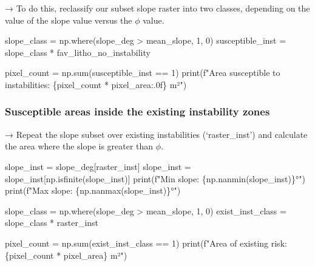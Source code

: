 \documentclass[
  letterpaper,
  DIV=11,
  numbers=noendperiod]{scrartcl}
\newenvironment{Shaded}{\begin{snugshade}}{\end{snugshade}}
\newcommand{\BuiltInTok}[1]{\textcolor[rgb]{0.00,0.23,0.31}{#1}}
\newcommand{\DecValTok}[1]{\textcolor[rgb]{0.68,0.00,0.00}{#1}}
\newcommand{\NormalTok}[1]{\textcolor[rgb]{0.00,0.23,0.31}{#1}}
\newcommand{\OperatorTok}[1]{\textcolor[rgb]{0.37,0.37,0.37}{#1}}
\newcommand{\SpecialCharTok}[1]{\textcolor[rgb]{0.37,0.37,0.37}{#1}}
\newcommand{\SpecialStringTok}[1]{\textcolor[rgb]{0.13,0.47,0.30}{#1}}
\begin{document}
→ To do this, reclassify our subset slope raster into two classes,
depending on the value of the slope value versus the \(\phi\) value.

\begin{Shaded}
\begin{Highlighting}[]
\NormalTok{slope\_class }\OperatorTok{=}\NormalTok{ np.where(slope\_deg }\OperatorTok{\textgreater{}}\NormalTok{ mean\_slope, }\DecValTok{1}\NormalTok{, }\DecValTok{0}\NormalTok{)}
\NormalTok{susceptible\_inst }\OperatorTok{=}\NormalTok{ slope\_class }\OperatorTok{*}\NormalTok{ fav\_litho\_no\_instability}

\NormalTok{pixel\_count }\OperatorTok{=}\NormalTok{ np.}\BuiltInTok{sum}\NormalTok{(susceptible\_inst }\OperatorTok{==} \DecValTok{1}\NormalTok{)}
\BuiltInTok{print}\NormalTok{(}\SpecialStringTok{f"Area susceptible to instabilities: }\SpecialCharTok{\{}\NormalTok{pixel\_count }\OperatorTok{*}\NormalTok{ pixel\_area}\SpecialCharTok{:.0f\}}\SpecialStringTok{ m²"}\NormalTok{)}
\end{Highlighting}
\end{Shaded}

\subsubsection{Susceptible areas inside the existing instability
zones}\label{susceptible-areas-inside-the-existing-instability-zones}

→ Repeat the slope subset over existing instabilities (`raster\_inst')
and calculate the area where the slope is greater than \(\phi\).

\begin{Shaded}
\begin{Highlighting}[]
\NormalTok{slope\_inst }\OperatorTok{=}\NormalTok{ slope\_deg[raster\_inst]}
\NormalTok{slope\_inst }\OperatorTok{=}\NormalTok{ slope\_inst[np.isfinite(slope\_inst)]}
\BuiltInTok{print}\NormalTok{(}\SpecialStringTok{f"Min slope: }\SpecialCharTok{\{}\NormalTok{np}\SpecialCharTok{.}\NormalTok{nanmin(slope\_inst)}\SpecialCharTok{\}}\SpecialStringTok{°"}\NormalTok{)}
\BuiltInTok{print}\NormalTok{(}\SpecialStringTok{f"Max slope:  }\SpecialCharTok{\{}\NormalTok{np}\SpecialCharTok{.}\NormalTok{nanmax(slope\_inst)}\SpecialCharTok{\}}\SpecialStringTok{°"}\NormalTok{)}

\NormalTok{slope\_class }\OperatorTok{=}\NormalTok{ np.where(slope\_deg }\OperatorTok{\textgreater{}}\NormalTok{ mean\_slope, }\DecValTok{1}\NormalTok{, }\DecValTok{0}\NormalTok{)}
\NormalTok{exist\_inst\_class }\OperatorTok{=}\NormalTok{ slope\_class }\OperatorTok{*}\NormalTok{ raster\_inst}

\NormalTok{pixel\_count }\OperatorTok{=}\NormalTok{ np.}\BuiltInTok{sum}\NormalTok{(exist\_inst\_class }\OperatorTok{==} \DecValTok{1}\NormalTok{)}
\BuiltInTok{print}\NormalTok{(}\SpecialStringTok{f"Area of existing risk: }\SpecialCharTok{\{}\NormalTok{pixel\_count }\OperatorTok{*}\NormalTok{ pixel\_area}\SpecialCharTok{\}}\SpecialStringTok{ m²"}\NormalTok{)}
\end{Highlighting}
\end{Shaded}
\end{document}
